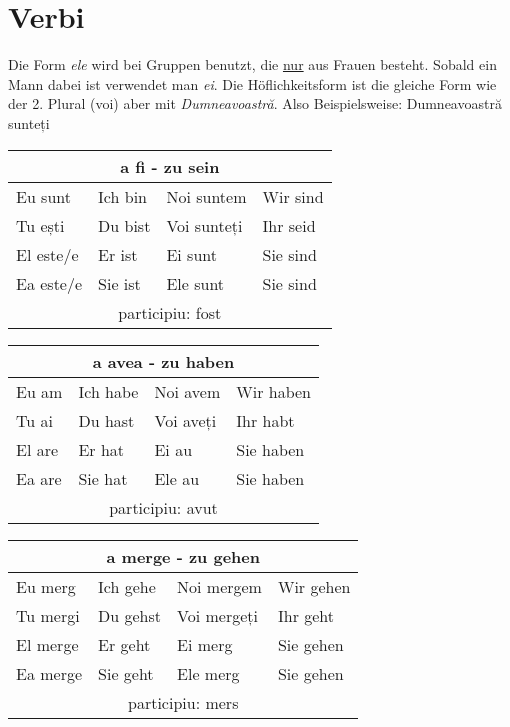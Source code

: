 \documentclass[11pt, oneside]{article}
\begin{document}
%
%
%
%
%
%
%
%
%
\singlespacing
\newpage
\section{Verbi}
Die Form \emph{ele} wird bei Gruppen benutzt, die \underline{nur} aus 
Frauen besteht. Sobald ein Mann dabei ist verwendet man \emph{ei}. 
Die Höflichkeitsform ist die gleiche Form wie der 2. Plural (voi) aber 
mit \emph{Dumneavoastră}. Also Beispielsweise: Dumneavoastră sunteți
\begin{center}
  \begin{tabular}{ |p{3.25cm}|p{3.25cm}||p{3.25cm}|p{3.25cm}|  }
      \hline
      \multicolumn{4}{|c|}{a fi - zu sein} \\
      \hline
      \hline
      Eu sunt & Ich bin & Noi suntem & Wir sind\\
      \hline
      Tu ești & Du bist & Voi sunteți & Ihr seid\\
      \hline
      El este/e & Er ist & Ei sunt & Sie sind\\ 
      Ea este/e & Sie ist & Ele sunt & Sie sind\\
      \hline
      \multicolumn{4}{|c|}{participiu: fost} \\
      \hline
     \end{tabular}
\end{center}
%
\begin{center}
  \begin{tabular}{ |p{3.25cm}|p{3.25cm}||p{3.25cm}|p{3.25cm}| }
      \hline
      \multicolumn{4}{|c|}{a avea - zu haben} \\
      \hline
      \hline
      Eu am & Ich habe & Noi avem & Wir haben\\
      \hline
      Tu ai & Du hast & Voi aveți & Ihr habt\\
      \hline
      El are & Er hat & Ei au & Sie haben\\ 
      Ea are & Sie hat & Ele au & Sie haben\\
      \hline
      \multicolumn{4}{|c|}{participiu: avut} \\
      \hline
     \end{tabular}
\end{center}
%
\begin{center}
  \begin{tabular}{ |p{3.25cm}|p{3.25cm}||p{3.25cm}|p{3.25cm}| }
      \hline
      \multicolumn{4}{|c|}{a merge - zu gehen} \\
      \hline
      \hline
      Eu merg & Ich gehe & Noi mergem & Wir gehen\\
      \hline
      Tu mergi & Du gehst & Voi mergeți & Ihr geht\\
      \hline
      El merge & Er geht & Ei merg & Sie gehen\\ 
      Ea merge & Sie geht & Ele merg & Sie gehen\\
      \hline
      \multicolumn{4}{|c|}{participiu: mers} \\
      \hline
     \end{tabular}
\end{center}
\end{document}
